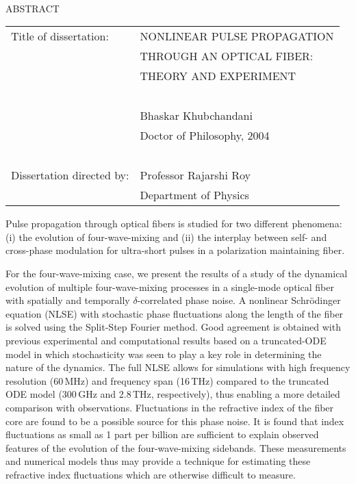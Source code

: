 
\hbox{\ }

\renewcommand{\baselinestretch}{1}
\small \normalsize

\begin{center}
\large{{ABSTRACT}}

\vspace{3em}

\end{center}
\hspace{-.15in}
\begin{tabular}{ll}
Title of dissertation:    & {\large  NONLINEAR PULSE PROPAGATION }\\
&                     {\large  THROUGH AN OPTICAL FIBER:} \\
&                     {\large  THEORY AND EXPERIMENT} \\
\ \\
&                          {\large  Bhaskar Khubchandani} \\
&                           {\large Doctor of Philosophy, 2004} \\
\ \\
Dissertation directed by: & {\large  Professor Rajarshi Roy} \\
&               {\large  Department of Physics } \\
\end{tabular}

\vspace{3em}

\renewcommand{\baselinestretch}{2}
\large \normalsize

Pulse propagation through optical fibers is studied for two different phenomena: (i) the evolution of four-wave-mixing and (ii) the interplay between self- and cross-phase modulation for ultra-short pulses in a polarization maintaining fiber.

For the four-wave-mixing case, we present the results of a study of the dynamical evolution of multiple four-wave-mixing processes in a single-mode optical fiber with spatially and temporally $\delta$-correlated phase noise. A nonlinear Schr\"odinger equation (NLSE) with stochastic phase fluctuations along the length of the fiber is solved using the Split-Step Fourier method. Good agreement is obtained with previous experimental and computational results based on a truncated-ODE model in which stochasticity was seen to play a key role in determining the nature of the dynamics. The full NLSE allows for simulations with high frequency resolution (60\,MHz) and frequency span (16\,THz) compared to the truncated ODE model (300\,GHz and 2.8\,THz, respectively), thus enabling a more detailed comparison with observations. Fluctuations in the refractive index of the fiber core are found to be a possible source for this phase noise. It is found that index fluctuations as small as 1 part per billion are sufficient to explain observed features of the evolution of the four-wave-mixing sidebands. These measurements and numerical models thus may provide a technique for estimating these refractive index fluctuations which are otherwise difficult to measure.

